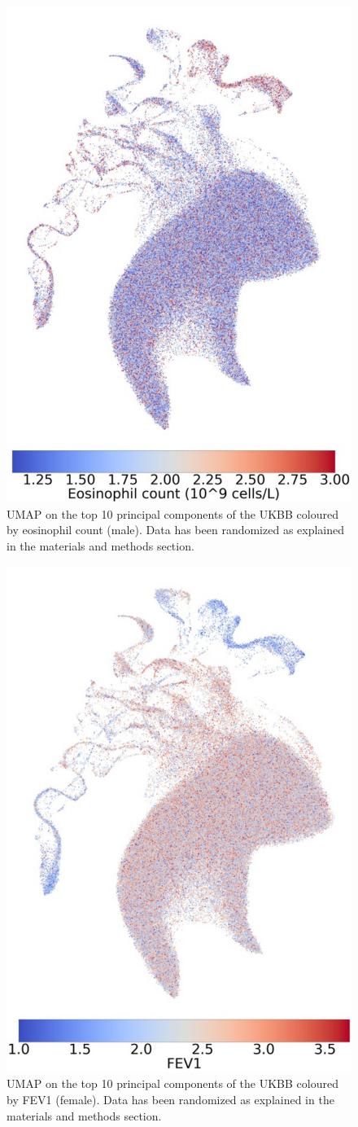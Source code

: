 \documentclass[12pt]{pnas-new}
\begin{document}
\begin{figure}
    \centering
    \includegraphics[width=0.4\columnwidth]{images/UKBB_UMAP_PC10_NN15_MD05_2018328174511_201871417720_eosinophill_count_pct5_m.pdf}
    \caption{UMAP on the top 10 principal components of the UKBB coloured by eosinophil count (male). Data has been randomized as explained in the materials and methods section.}
    \label{fig:supp_ukbb_eosinophill_m}
\end{figure}

\begin{figure}
    \centering
    \includegraphics[width=0.4\columnwidth]{images/UKBB_UMAP_PC10_NN15_MD05_2018328174511_201871416305_3063_0_0_pct1_f.pdf}
    \caption{UMAP on the top 10 principal components of the UKBB coloured by FEV1 (female). Data has been randomized as explained in the materials and methods section.}
    \label{fig:supp_ukbb_fev_f}
\end{figure}
\end{document}
